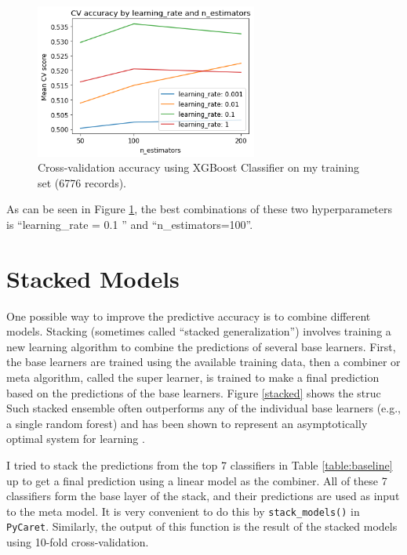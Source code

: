 \documentclass[11pt]{article}
\begin{document}
\begin{figure}[H]
  \caption{Cross-validation accuracy using XGBoost Classifier on my training set (6776 records).}
  \label{cv_xgbc}
  \centering
  \includegraphics[width=0.65\textwidth]{../img/cv_xgbc.png}
\end{figure}

As can be seen in Figure \ref{cv_xgbc}, the best combinations of these two hyperparameters is ``learning\_rate = 0.1 '' and ``n\_estimators=100''.

\section{ Stacked Models}
One possible way to improve the predictive accuracy is to combine different models. Stacking (sometimes called ``stacked generalization'') involves training a new learning algorithm to combine the predictions of several base learners\cite{boehmke2019hands}. First, the base learners are trained using the available training data, then a combiner or meta algorithm, called the super learner, is trained to make a final prediction based on the predictions of the base learners\cite{boehmke2019hands}. Figure \ref{stacked} shows the struc
Such stacked ensemble often outperforms any of the individual base learners (e.g., a single random forest) and has been shown to represent an asymptotically optimal system for learning \cite{van2007super}.

I tried to stack the predictions from the top 7 classifiers in Table \ref{table:baseline} up to get a final prediction using a linear model as the combiner. All of these 7 classifiers form the base layer of the stack, and their predictions are used as input to the meta model. It is very convenient to do this by \texttt{stack\_models()} in \texttt{PyCaret}. Similarly, the output of this function is the result of the stacked models using 10-fold cross-validation.
\end{document}
